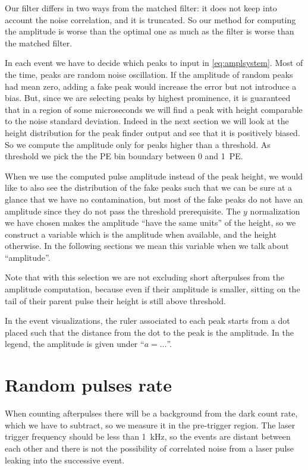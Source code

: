 Our filter differs in two ways from the matched filter: it does not keep into
account the noise correlation, and it is truncated. So our method for computing
the amplitude is worse than the optimal one as much as the filter is worse than
the matched filter.

In each event we have to decide which peaks to input in \eqref{eq:amplsystem}.
Most of the time, peaks are random noise oscillation. If the amplitude of
random peaks had mean zero, adding a fake peak would increase the error but not
introduce a bias. But, since we are selecting peaks by highest prominence, it
is guaranteed that in a region of some microseconds we will find a peak with
height comparable to the noise standard deviation. Indeed in the next section
we will look at the height distribution for the peak finder output and see that
it is positively biased. So we compute the amplitude only for peaks higher than
a threshold. As threshold we pick the the PE bin boundary between 0 and 1~PE.

When we use the computed pulse amplitude instead of the peak height, we would
like to also see the distribution of the fake peaks such that we can be sure at
a glance that we have no contamination, but most of the fake peaks do not have
an amplitude since they do not pass the threshold prerequisite. The $y$
normalization we have chosen makes the amplitude ``have the same units'' of the
height, so we construct a variable which is the amplitude when available, and
the height otherwise. In the following sections we mean this variable when we
talk about ``amplitude''.

Note that with this selection we are not excluding short afterpulses from the
amplitude computation, because even if their amplitude is smaller, sitting on
the tail of their parent pulse their height is still above threshold.

In the event visualizations, the ruler associated to each peak starts from a
dot placed such that the distance from the dot to the peak is the amplitude.
In the legend, the amplitude is given under ``$a = \ldots$''.

\section{Random pulses rate}
\label{sec:random}

When counting afterpulses there will be a background from the dark count rate,
which we have to subtract, so we measure it in the pre-trigger region. The
laser trigger frequency should be less than \SI{1}{kHz}, so the events are
distant between each other and there is not the possibility of correlated noise
from a laser pulse leaking into the successive event.

